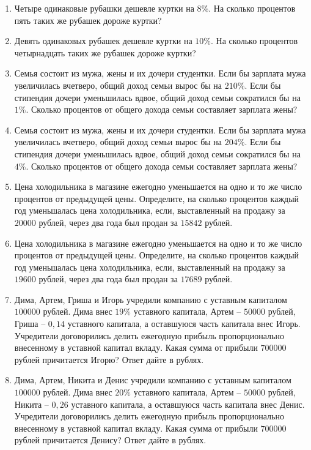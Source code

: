 \documentclass[12pt, a4paper]{article}
\begin{document}
\begin{enumerate}
		\item Четыре одинаковые рубашки дешевле куртки на \( 8\% \). На сколько процентов пять таких же рубашек дороже куртки?
		\item Девять одинаковых рубашек дешевле куртки на \( 10\% \). На сколько процентов четырнадцать таких же рубашек дороже куртки?
		\item Семья состоит из мужа, жены и их дочери студентки. Если бы зарплата мужа увеличилась вчетверо, общий доход семьи вырос бы на \( 210\% \). Если бы стипендия дочери уменьшилась вдвое, общий доход семьи сократился бы на \( 1\% \). Сколько процентов от общего дохода семьи составляет зарплата жены?
		\item Семья состоит из мужа, жены и их дочери студентки. Если бы зарплата мужа увеличилась вчетверо, общий доход семьи вырос бы на \( 204\% \). Если бы стипендия дочери уменьшилась вдвое, общий доход семьи сократился бы на \( 4\% \). Сколько процентов от общего дохода семьи составляет зарплата жены?
		\item Цена холодильника в магазине ежегодно уменьшается на одно и то же число процентов от предыдущей цены. Определите, на сколько процентов каждый год уменьшалась цена холодильника, если, выставленный на продажу за \(20 000\) рублей, через два года был продан за \(15 842\) рублей.
		\item Цена холодильника в магазине ежегодно уменьшается на одно и то же число процентов от предыдущей цены. Определите, на сколько процентов каждый год уменьшалась цена холодильника, если, выставленный на продажу за \(19 600\) рублей, через два года был продан за \(17 689\) рублей.
		\item Дима, Артем, Гриша и Игорь учредили компанию с уставным капиталом \( 100000 \) рублей. Дима внес \( 19\% \) уставного капитала, Артем –  \( 50000 \) рублей, Гриша – \( 0,14 \) уставного капитала, а оставшуюся часть капитала внес Игорь. Учредители договорились делить ежегодную прибыль пропорционально внесенному в уставной капитал вкладу. Какая сумма от прибыли \( 700000 \) рублей причитается Игорю? Ответ дайте в рублях.
		\item Дима, Артем, Никита и Денис учредили компанию с уставным капиталом \( 100000 \) рублей. Дима внес \( 20\% \) уставного капитала, Артем –  \( 50000 \) рублей, Никита – \( 0,26 \) уставного капитала, а оставшуюся часть капитала внес Денис. Учредители договорились делить ежегодную прибыль пропорционально внесенному в уставной капитал вкладу. Какая сумма от прибыли \( 700000 \) рублей причитается Денису? Ответ дайте в рублях.

\end{enumerate}
\end{document}
